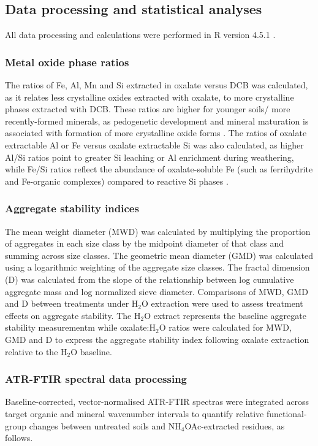 \documentclass[preprint,12pt]{elsarticle}
\begin{document}
\subsection{Data processing and statistical analyses}
\label{subsec:statistics}
All data processing and calculations were performed in R version 4.5.1 \citep{RCoreTeam2025}.
  
\subsubsection{Metal oxide phase ratios}
The ratios of Fe, Al, Mn and Si extracted in oxalate versus DCB was calculated, as it relates less crystalline oxides extracted with oxalate, to more crystalline phases extracted with DCB. These ratios are higher for younger soils/ more recently-formed minerals, as pedogenetic development and mineral maturation is associated with formation of more crystalline oxide forms \citep{maier2025parent}. The ratios of oxalate extractable Al or Fe versus oxalate extractable Si was also calculated, as higher Al/Si ratios point to greater Si leaching or Al enrichment during weathering, while Fe/Si ratios reflect the abundance of oxalate-soluble Fe (such as ferrihydrite and Fe-organic complexes) compared to reactive Si phases \citep{Parfitt1988}. 

\subsubsection{Aggregate stability indices}

The mean weight diameter (MWD) was calculated by multiplying the proportion of aggregates in each size class by the midpoint diameter of that class and summing across size classes. The geometric mean diameter (GMD) was calculated using a logarithmic weighting of the aggregate size classes. The fractal dimension (D) was calculated from the slope of the relationship between log cumulative aggregate mass and log normalized sieve diameter. Comparisons of MWD, GMD and D between treatments under H$_2$O extraction were used to assess treatment effects on aggregate stability. The H$_2$O extract represents the baseline aggregate stability measurementm while oxalate:H$_2$O ratios were calculated for MWD, GMD and D to express the aggregate stability index following oxalate extraction relative to the H$_2$O baseline.

\subsubsection{ATR-FTIR spectral data processing}
Baseline-corrected, vector-normalised ATR-FTIR spectras were integrated across target organic and mineral wavenumber intervals to quantify relative functional-group changes between untreated soils and NH$_4$OAc-extracted residues, as follows.
\end{document}
